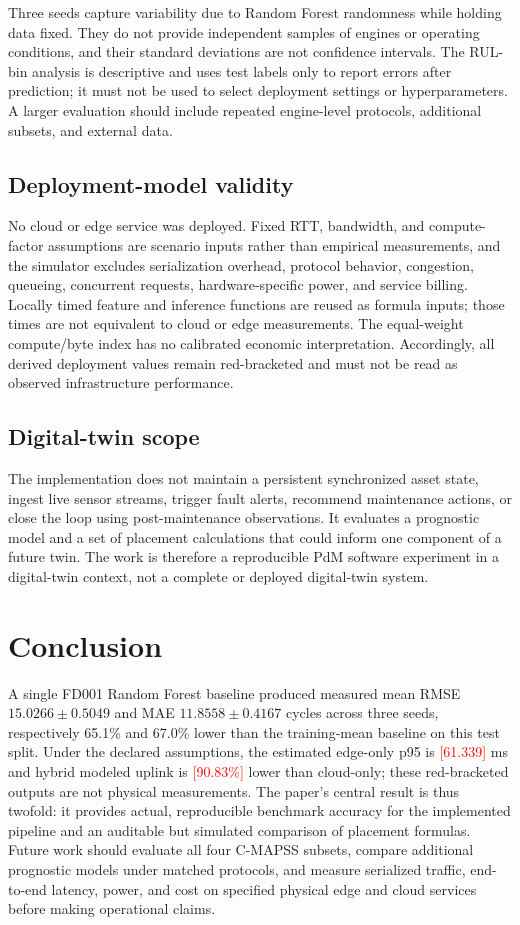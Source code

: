 ﻿\documentclass[conference]{IEEEtran}
\newcommand{\simval}[1]{\textcolor{red}{[#1]}}
\begin{document}
Three seeds capture variability due to Random Forest randomness while holding data fixed. They do not provide independent samples of engines or operating conditions, and their standard deviations are not confidence intervals. The RUL-bin analysis is descriptive and uses test labels only to report errors after prediction; it must not be used to select deployment settings or hyperparameters. A larger evaluation should include repeated engine-level protocols, additional subsets, and external data.

\subsection{Deployment-model validity}
No cloud or edge service was deployed. Fixed RTT, bandwidth, and compute-factor assumptions are scenario inputs rather than empirical measurements, and the simulator excludes serialization overhead, protocol behavior, congestion, queueing, concurrent requests, hardware-specific power, and service billing. Locally timed feature and inference functions are reused as formula inputs; those times are not equivalent to cloud or edge measurements. The equal-weight compute/byte index has no calibrated economic interpretation. Accordingly, all derived deployment values remain red-bracketed and must not be read as observed infrastructure performance.

\subsection{Digital-twin scope}
The implementation does not maintain a persistent synchronized asset state, ingest live sensor streams, trigger fault alerts, recommend maintenance actions, or close the loop using post-maintenance observations. It evaluates a prognostic model and a set of placement calculations that could inform one component of a future twin. The work is therefore a reproducible PdM software experiment in a digital-twin context, not a complete or deployed digital-twin system.

\section{Conclusion}
A single FD001 Random Forest baseline produced measured mean RMSE $15.0266\pm0.5049$ and MAE $11.8558\pm0.4167$ cycles across three seeds, respectively 65.1\% and 67.0\% lower than the training-mean baseline on this test split. Under the declared assumptions, the estimated edge-only p95 is \simval{61.339} ms and hybrid modeled uplink is \simval{90.83\%} lower than cloud-only; these red-bracketed outputs are not physical measurements. The paper's central result is thus twofold: it provides actual, reproducible benchmark accuracy for the implemented pipeline and an auditable but simulated comparison of placement formulas. Future work should evaluate all four C-MAPSS subsets, compare additional prognostic models under matched protocols, and measure serialized traffic, end-to-end latency, power, and cost on specified physical edge and cloud services before making operational claims.
\end{document}
